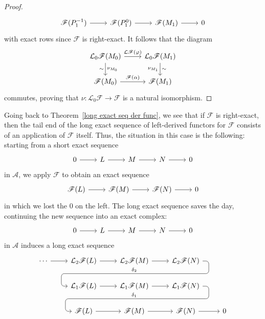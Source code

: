 \begin{proof}
\[\begin{tikzcd}
\mathscr{F}(P_1^{-1})\ar[r]&\mathscr{F}(P_1^0)\ar[r]&\mathscr{F}(M_1)\ar[r]&0
\end{tikzcd}\]
with exact rows since $\mathscr{F}$ is right-exact. It follows that the diagram
\[\begin{tikzcd}
\mathcal{L}_0\mathscr{F}(M_0)\ar[r,"\mathcal{L}\mathscr{F}(\varphi)"]\ar[d,"\nu_{M_0}","\sim"']&\mathcal{L}_0\mathscr{F}(M_1)\ar[d,swap,"\nu_{M_1}","\sim"']\\
\mathscr{F}(M_0)\ar[r,"\mathscr{F}(\alpha)"]&\mathscr{F}(M_1)
\end{tikzcd}\]
commutes, proving that $\nu:\mathcal{L}_0\mathscr{F}\to\mathscr{F}$ is a natural isomorphism.
\end{proof}
Going back to Theorem~\ref{long exact seq der func}, we see that if $\mathscr{F}$ is right-exact, then the tail end of the long exact sequence of left-derived functors for $\mathscr{F}$ consists of an application of $\mathscr{F}$ itself. Thus, the situation in this case is the following: starting from a short exact sequence
\[\begin{tikzcd}
0\ar[r]&L\ar[r]&M\ar[r]&N\ar[r]&0
\end{tikzcd}\]
in $\mathcal{A}$, we apply $\mathscr{F}$ to obtain an exact sequence
\[\begin{tikzcd}
\mathscr{F}(L)\ar[r]&\mathscr{F}(M)\ar[r]&\mathscr{F}(N)\ar[r]&0
\end{tikzcd}\]
in which we lost the $0$ on the left. The long exact sequence saves the day, continuing the new sequence into an exact complex:
\[\begin{tikzcd}
0\ar[r]&L\ar[r]&M\ar[r]&N\ar[r]&0
\end{tikzcd}\]
in $\mathcal{A}$ induces a long exact sequence
\[\begin{tikzcd}
\cdots\ar[r]&\mathcal{L}_2\mathscr{F}(L)\ar[r] &\mathcal{L}_2\mathscr{F}(M)\rar
\ar[draw=none]{d}[name=X, anchor=center]{}
&\mathcal{L}_2\mathscr{F}(N)\ar[rounded corners,swap,
to path={ -- ([xshift=2ex]\tikztostart.east)
	|- (X.center) \tikztonodes
	-| ([xshift=-2ex]\tikztotarget.west)
	-- (\tikztotarget)}]{dll}[at end]{\delta_2}&\\      
&\mathcal{L}_1\mathscr{F}(L)\rar &\mathcal{L}_1\mathscr{F}(M)\ar[draw=none]{d}[name=Y, anchor=center]{}\rar &\mathcal{L}_1\mathscr{F}(N)\ar[rounded corners,swap,
to path={ -- ([xshift=2ex]\tikztostart.east)
	|- (Y.center) \tikztonodes
	-| ([xshift=-2ex]\tikztotarget.west)
	-- (\tikztotarget)}]{dll}[at end]{\delta_1}&\\
&\mathscr{F}(L)\rar&\mathscr{F}(M)\rar&\mathscr{F}(N)\ar[r]&0
\end{tikzcd}\]
